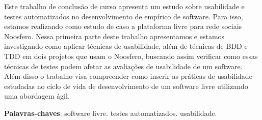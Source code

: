 \begin{resumo}

Este trabalho de conclusão de curso apresenta um estudo sobre usabilidade e testes automatizados no desenvolvimento de empírico de software. Para isso, estamos realizando como estudo de caso a plataforma livre para rede sociais Noosfero. Nessa primeira parte deste trabalho apresentamos e estamos investigando como aplicar técnicas de usabilidade, além de técnicas de BDD e TDD em dois projetos que usam o Noosfero, buscando assim verificar como essas técnicas de testes podem afetar as avaliações de usabilidade de um software.  Além disso o trabalho visa compreender como inserir as práticas de usabilidade estudadas no ciclo de vida de desenvolvimento de um software livre utilizando uma abordagem ágil.

\vspace{\onelineskip}
    
 \noindent
 \textbf{Palavras-chaves}: software livre. testes automatizados. usabilidade.

\end{resumo}
